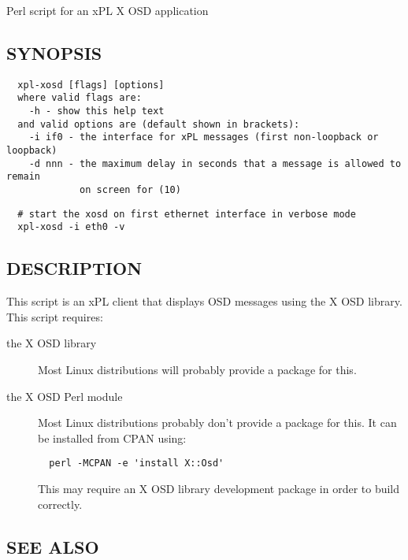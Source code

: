\documentclass[12pt,a4paper]{article}
\begin{document}
Perl script for an xPL X OSD application

\subsection*{SYNOPSIS\label{xpl-xosd_SYNOPSIS}}
\begin{verbatim}
  xpl-xosd [flags] [options]
  where valid flags are:
    -h - show this help text
  and valid options are (default shown in brackets):
    -i if0 - the interface for xPL messages (first non-loopback or loopback)
    -d nnn - the maximum delay in seconds that a message is allowed to remain
             on screen for (10)
\end{verbatim}
\begin{verbatim}
  # start the xosd on first ethernet interface in verbose mode
  xpl-xosd -i eth0 -v
\end{verbatim}
\subsection*{DESCRIPTION\label{xpl-xosd_DESCRIPTION}}


This script is an xPL client that displays OSD messages using the X OSD
library.  This script requires:

\begin{description}

\item[{the X OSD library}] \mbox{}

Most Linux distributions will probably provide a package for this.


\item[{the X OSD Perl module}] \mbox{}

Most Linux distributions probably don't provide a package for this.  It
can be installed from CPAN using:

\begin{verbatim}
  perl -MCPAN -e 'install X::Osd'
\end{verbatim}


This may require an X OSD library development package in order to build
correctly.

\end{description}
\subsection*{SEE ALSO\label{xpl-xosd_SEE_ALSO}}
\end{document}
